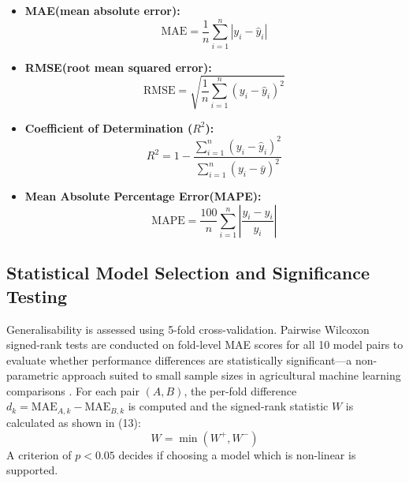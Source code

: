 \documentclass[conference]{IEEEtran}
\begin{document}
	\begin{itemize}
		\item \textbf{MAE(mean absolute error):}
		\begin{equation}
			\text{MAE} = \frac{1}{n} \sum_{i=1}^{n} |y_i  -   \hat{y}_i|
			\tag{10}	
		\end{equation}
		\item \textbf{RMSE(root mean squared error):}
		\begin{equation}
			\text{RMSE} = \sqrt{\frac{1}{n} \sum_{i=1}^{n} (y_i  -  \hat{y}_i)^2}
			\tag{11}
		\end{equation}
		\item \textbf{Coefficient of Determination ($R^2$):}
		\begin{equation}
			R^2 = 1 - \frac{\sum_{i=1}^{n} (y_i - \hat{y}_i)^2}{\sum_{i=1}^{n} (y_i  -  \bar{y})^2}
			\tag{12}
		\end{equation}
		\item \textbf{Mean Absolute Percentage Error(MAPE):}
		\begin{equation}
			\mathrm{MAPE} = \frac{100}{n} \sum_{i=1}^{n} \left| \frac{y_i - \hat{y}_i}{y_i} \right|
			\tag{13}
		\end{equation}
	\end{itemize}
	
	\subsection{Statistical Model Selection and Significance Testing}
	Generalisability is assessed using 5-fold cross-validation. Pairwise Wilcoxon signed-rank tests are conducted on fold-level MAE scores for all 10 model pairs to evaluate whether performance differences are statistically significant---a non-parametric approach suited to small sample sizes in agricultural machine learning comparisons \cite{ref8, ref9}. For each pair $(A, B)$, the per-fold difference $d_k = \text{MAE}_{A,k} - \text{MAE}_{B,k}$ is computed and the signed-rank statistic $W$ is calculated as shown in (13):
	\begin{equation}
		W = \min(W^+, W^-)
		\tag{14}
	\end{equation}
	A criterion of $p < 0.05$ decides if choosing a  model which is non-linear is supported.
	
\end{document}
